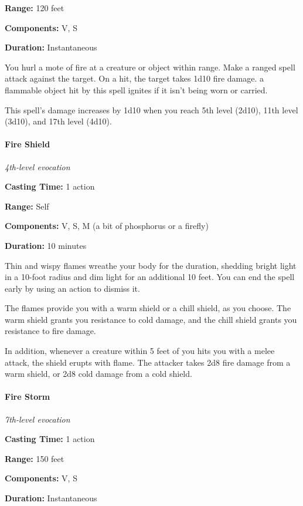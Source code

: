 \documentclass[
]{article}
\begin{document}
\textbf{Range:} 120 feet

\textbf{Components:} V, S

\textbf{Duration:} Instantaneous

You hurl a mote of fire at a creature or object within range. Make a
ranged spell attack against the target. On a hit, the target takes 1d10
fire damage. a flammable object hit by this spell ignites if it isn't
being worn or carried.

This spell's damage increases by 1d10 when you reach 5th level (2d10),
11th level (3d10), and 17th level (4d10).

\hypertarget{fire-shield}{%
\paragraph{Fire Shield}\label{fire-shield}}

\emph{4th-level evocation}

\textbf{Casting Time:} 1 action

\textbf{Range:} Self

\textbf{Components:} V, S, M (a bit of phosphorus or a firefly)

\textbf{Duration:} 10 minutes

Thin and wispy flames wreathe your body for the duration, shedding
bright light in a 10-foot radius and dim light for an additional 10
feet. You can end the spell early by using an action to dismiss it.

The flames provide you with a warm shield or a chill shield, as you
choose. The warm shield grants you resistance to cold damage, and the
chill shield grants you resistance to fire damage.

In addition, whenever a creature within 5 feet of you hits you with a
melee attack, the shield erupts with flame. The attacker takes 2d8 fire
damage from a warm shield, or 2d8 cold damage from a cold shield.

\hypertarget{fire-storm}{%
\paragraph{Fire Storm}\label{fire-storm}}

\emph{7th-level evocation}

\textbf{Casting Time:} 1 action

\textbf{Range:} 150 feet

\textbf{Components:} V, S

\textbf{Duration:} Instantaneous
\end{document}
